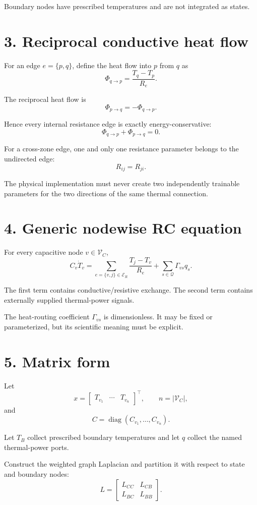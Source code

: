 \documentclass[11pt]{article}
\newcommand{\Vc}{\mathcal{V}_{C}}
\newcommand{\Er}{\mathcal{E}_{R}}
\newcommand{\Qset}{\mathcal{Q}}
\newcommand{\diag}{\operatorname{diag}}
\begin{document}
Boundary nodes have prescribed temperatures and are not integrated as states.

\section*{3. Reciprocal conductive heat flow}

For an edge $e=\{p,q\}$, define the heat flow into $p$ from $q$ as
\[
\boxed{
\Phi_{q\rightarrow p}
=
\frac{T_q-T_p}{R_e}.
}
\]

The reciprocal heat flow is
\[
\Phi_{p\rightarrow q}
=
-\Phi_{q\rightarrow p}.
\]

Hence every internal resistance edge is exactly energy-conservative:
\[
\boxed{
\Phi_{q\rightarrow p}
+
\Phi_{p\rightarrow q}
=
0.
}
\]

For a cross-zone edge, one and only one resistance parameter belongs to the
undirected edge:
\[
\boxed{R_{ij}=R_{ji}.}
\]

The physical implementation must never create two independently trainable
parameters for the two directions of the same thermal connection.

\section*{4. Generic nodewise RC equation}

For every capacitive node $v\in\Vc$,
\[
\boxed{
C_v\dot T_v
=
\sum_{e=\{v,j\}\in\Er}
\frac{T_j-T_v}{R_e}
+
\sum_{s\in\Qset}
\Gamma_{vs}q_s.
}
\tag{E0.3-1}
\]

The first term contains conductive/resistive exchange.
The second term contains externally supplied thermal-power signals.

The heat-routing coefficient $\Gamma_{vs}$ is dimensionless.
It may be fixed or parameterized, but its scientific meaning must be explicit.

\section*{5. Matrix form}

Let
\[
x=
\begin{bmatrix}
T_{v_1}&\cdots&T_{v_n}
\end{bmatrix}^{\!\top},
\qquad n=|\Vc|,
\]
and
\[
C=\diag(C_{v_1},\ldots,C_{v_n}).
\]

Let $T_B$ collect prescribed boundary temperatures and let $q$ collect the
named thermal-power ports.

Construct the weighted graph Laplacian and partition it with respect to state
and boundary nodes:
\[
L=
\begin{bmatrix}
L_{CC}&L_{CB}\\
L_{BC}&L_{BB}
\end{bmatrix}.
\]
\end{document}
